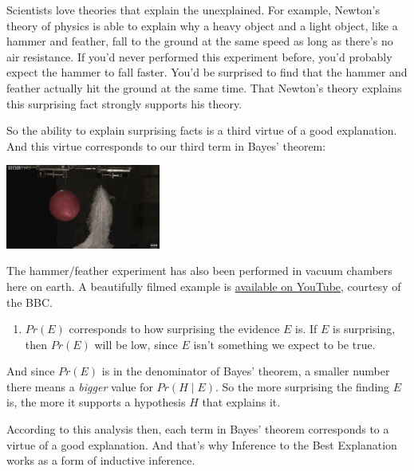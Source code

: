 \documentclass[justified]{tufte-book}
\providecommand{\tightlist}{%
  \setlength{\itemsep}{0pt}\setlength{\parskip}{0pt}}
\newcommand{\given}{\mid}
\newcommand{\p}{Pr}
\theoremstyle{definition}
\theoremstyle{definition}
\theoremstyle{definition}
\theoremstyle{definition}
\theoremstyle{remark}
\begin{document}
Scientists love theories that explain the unexplained. For example, Newton's theory of physics is able to explain why a heavy object and a light object, like a hammer and feather, fall to the ground at the same speed as long as there's no air resistance. If you'd never performed this experiment before, you'd probably expect the hammer to fall faster. You'd be surprised to find that the hammer and feather actually hit the ground at the same time. That Newton's theory explains this surprising fact strongly supports his theory.

So the ability to explain surprising facts is a third virtue of a good explanation. And this virtue corresponds to our third term in Bayes' theorem:

\begin{marginfigure}
\includegraphics[width=2in]{img/vacuum} \caption[The hammer/feather experiment has also been performed in vacuum chambers here on earth. A beautifully filmed example is \href{https://bit.ly/10hw8mP}{available on YouTube}, courtesy of the BBC.]{The hammer/feather experiment has also been performed in vacuum chambers here on earth. A beautifully filmed example is \href{https://bit.ly/10hw8mP}{available on YouTube}, courtesy of the BBC.}\label{fig:unnamed-chunk-87}
\end{marginfigure}

\begin{enumerate}
\def\labelenumi{\arabic{enumi}.}
\setcounter{enumi}{2}
\tightlist
\item
  \(\p(E)\) corresponds to how surprising the evidence \(E\) is. If \(E\) is surprising, then \(\p(E)\) will be low, since \(E\) isn't something we expect to be true.
\end{enumerate}

And since \(\p(E)\) is in the denominator of Bayes' theorem, a smaller number there means a \emph{bigger} value for \(\p(H \given E)\). So the more surprising the finding \(E\) is, the more it supports a hypothesis \(H\) that explains it.

According to this analysis then, each term in Bayes' theorem corresponds to a virtue of a good explanation. And that's why Inference to the Best Explanation works as a form of inductive inference.
\end{document}
